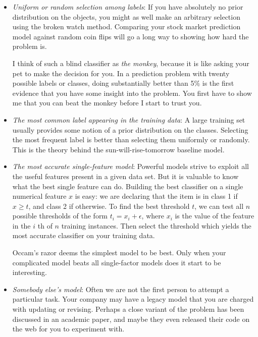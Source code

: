 \documentclass[10pt]{article}
\begin{document}
\begin{itemize}
  \item \textit{Uniform or random selection among labels}: If you have absolutely no prior distribution on the objects, you might as well make an arbitrary selection using the broken watch method. Comparing your stock market prediction model against random coin flips will go a long way to showing how hard the problem is.

  I think of such a blind classifier as \textit{the monkey}, because it is like asking your pet to make the decision for you. In a prediction problem with twenty possible labels or classes, doing substantially better than 5\% is the first evidence that you have some insight into the problem. You first have to show me that you can beat the monkey before I start to trust you.
  
  \item \textit{The most common label appearing in the training data}: A large training set usually provides some notion of a prior distribution on the classes. Selecting the most frequent label is better than selecting them uniformly or randomly. This is the theory behind the sun-will-rise-tomorrow baseline model.
  
  \item \textit{The most accurate single-feature model}: Powerful models strive to exploit all the useful features present in a given data set. But it is valuable to know what the best single feature can do. Building the best classifier on a single numerical feature \(x\) is easy: we are declaring that the item is in class 1 if \(x \geq t\), and class 2 if otherwise. To find the best threshold \(t\), we can test all \(n\) possible thresholds of the form \(t_{i}=x_{i}+\epsilon\), where \(x_{i}\) is the value of the feature in the \(i\) th of \(n\) training instances. Then select the threshold which yields the most accurate classifier on your training data.
  
  Occam’s razor deems the simplest model to be best. Only when your complicated model beats all single-factor models does it start to be interesting.
  
  \item \textit{Somebody else’s model}: Often we are not the first person to attempt a particular task. Your company may have a legacy model that you are charged with updating or revising. Perhaps a close variant of the problem has been discussed in an academic paper, and maybe they even released their code on the web for you to experiment with.


\end{itemize}
\end{document}

